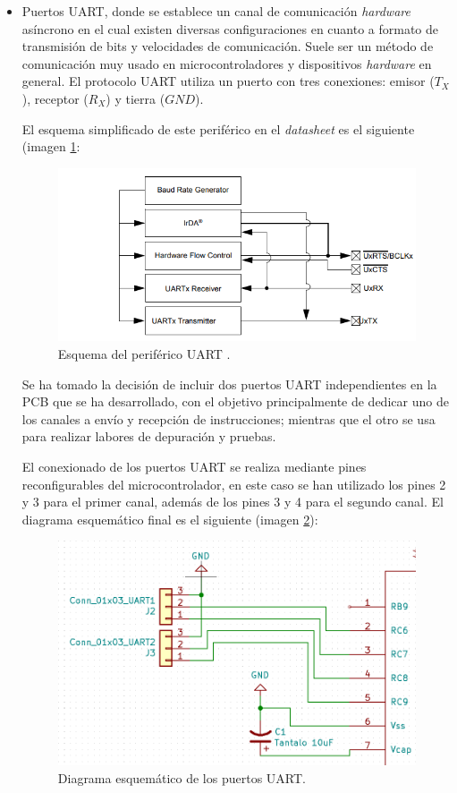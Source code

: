 \begin{itemize}
    \item Puertos UART, donde se establece un canal de comunicación \textit{hardware} asíncrono en el cual existen diversas configuraciones en cuanto a formato de transmisión de bits y velocidades de comunicación. Suele ser un método de comunicación muy usado en microcontroladores y dispositivos \textit{hardware} en general. El protocolo UART utiliza un puerto con tres conexiones: emisor ($T_X$), receptor ($R_X$) y tierra ($GND$).
    
    El esquema simplificado de este periférico en el \textit{datasheet} es el siguiente (imagen \ref{fig:Uart_Datasheet}:
    
    \begin{figure}[H]
    \centering 
    \includegraphics[width=.6\linewidth]{pictures/UARTdatasheet.PNG}
    \caption{Esquema del periférico UART \cite{DsPIC33EP512GM60416BitMicrocontrollers}.}
    \label{fig:Uart_Datasheet}
    \end{figure}
    
    Se ha tomado la decisión de incluir dos puertos UART independientes en la \ac{PCB} que se ha desarrollado, con el objetivo principalmente de dedicar uno de los canales a envío y recepción de instrucciones; mientras que el otro se usa para realizar labores de depuración y pruebas.
    
    El conexionado de los puertos UART  se realiza mediante pines reconfigurables del microcontrolador, en este caso se han utilizado los pines 2 y 3 para el primer canal, además de los pines 3 y 4 para el segundo canal. El diagrama esquemático final es el siguiente (imagen \ref{fig:Uart_Esquematico}):
    
    \begin{figure}[H]
    \centering 
    \includegraphics[width=.6\linewidth]{pictures/UART.PNG}
    \caption{Diagrama esquemático de los puertos UART.}
    \label{fig:Uart_Esquematico}
    \end{figure}
    

\end{itemize}
